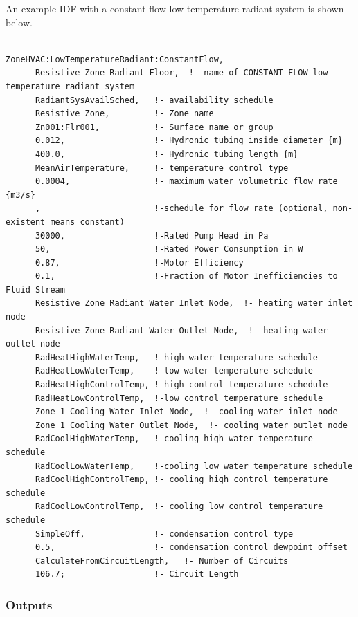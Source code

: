 An example IDF with a constant flow low temperature radiant system is shown below.

\begin{lstlisting}

ZoneHVAC:LowTemperatureRadiant:ConstantFlow,
      Resistive Zone Radiant Floor,  !- name of CONSTANT FLOW low temperature radiant system
      RadiantSysAvailSched,   !- availability schedule
      Resistive Zone,         !- Zone name
      Zn001:Flr001,           !- Surface name or group
      0.012,                  !- Hydronic tubing inside diameter {m}
      400.0,                  !- Hydronic tubing length {m}
      MeanAirTemperature,     !- temperature control type
      0.0004,                 !- maximum water volumetric flow rate {m3/s}
      ,                       !-schedule for flow rate (optional, non-existent means constant)
      30000,                  !-Rated Pump Head in Pa
      50,                     !-Rated Power Consumption in W
      0.87,                   !-Motor Efficiency
      0.1,                    !-Fraction of Motor Inefficiencies to Fluid Stream
      Resistive Zone Radiant Water Inlet Node,  !- heating water inlet node
      Resistive Zone Radiant Water Outlet Node,  !- heating water outlet node
      RadHeatHighWaterTemp,   !-high water temperature schedule
      RadHeatLowWaterTemp,    !-low water temperature schedule
      RadHeatHighControlTemp, !-high control temperature schedule
      RadHeatLowControlTemp,  !-low control temperature schedule
      Zone 1 Cooling Water Inlet Node,  !- cooling water inlet node
      Zone 1 Cooling Water Outlet Node,  !- cooling water outlet node
      RadCoolHighWaterTemp,   !-cooling high water temperature schedule
      RadCoolLowWaterTemp,    !-cooling low water temperature schedule
      RadCoolHighControlTemp, !- cooling high control temperature schedule
      RadCoolLowControlTemp,  !- cooling low control temperature schedule
      SimpleOff,              !- condensation control type
      0.5,                    !- condensation control dewpoint offset
      CalculateFromCircuitLength,   !- Number of Circuits
      106.7;                  !- Circuit Length
\end{lstlisting}

\subsubsection{Outputs}\label{outputs-6-007}


